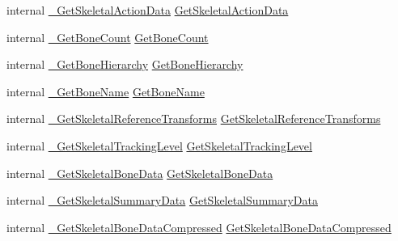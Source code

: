 \begin{DoxyCompactItemize}
\item 
internal \mbox{\hyperlink{struct_valve_1_1_v_r_1_1_i_v_r_input_ab2dfec875e32f9da69b95675a94957a7}{\+\_\+\+Get\+Skeletal\+Action\+Data}} \mbox{\hyperlink{struct_valve_1_1_v_r_1_1_i_v_r_input_aca7416db314f3341f5ad411a04a431df}{Get\+Skeletal\+Action\+Data}}
\item 
internal \mbox{\hyperlink{struct_valve_1_1_v_r_1_1_i_v_r_input_a45156426324aa529ba4317faa0ddbded}{\+\_\+\+Get\+Bone\+Count}} \mbox{\hyperlink{struct_valve_1_1_v_r_1_1_i_v_r_input_a0b5ff4370a510db94339ade7e82cb2c8}{Get\+Bone\+Count}}
\item 
internal \mbox{\hyperlink{struct_valve_1_1_v_r_1_1_i_v_r_input_a1e1830a194a220b6947473ecfb0966db}{\+\_\+\+Get\+Bone\+Hierarchy}} \mbox{\hyperlink{struct_valve_1_1_v_r_1_1_i_v_r_input_a11001075e37728a43dbf3af84bdb8140}{Get\+Bone\+Hierarchy}}
\item 
internal \mbox{\hyperlink{struct_valve_1_1_v_r_1_1_i_v_r_input_ab946688fdae1876df1fa3c06426579cf}{\+\_\+\+Get\+Bone\+Name}} \mbox{\hyperlink{struct_valve_1_1_v_r_1_1_i_v_r_input_a34221d6f94345f4c7f2621a55978a202}{Get\+Bone\+Name}}
\item 
internal \mbox{\hyperlink{struct_valve_1_1_v_r_1_1_i_v_r_input_a1d1f340254e37a3037714eb5ee548afd}{\+\_\+\+Get\+Skeletal\+Reference\+Transforms}} \mbox{\hyperlink{struct_valve_1_1_v_r_1_1_i_v_r_input_a617bf2834dfe52f9f0d0bed5c4bdcae1}{Get\+Skeletal\+Reference\+Transforms}}
\item 
internal \mbox{\hyperlink{struct_valve_1_1_v_r_1_1_i_v_r_input_a0521ebd1a374c8e54ca2864d7b6d57eb}{\+\_\+\+Get\+Skeletal\+Tracking\+Level}} \mbox{\hyperlink{struct_valve_1_1_v_r_1_1_i_v_r_input_ae77211631324af5588fcbd18f87b65f3}{Get\+Skeletal\+Tracking\+Level}}
\item 
internal \mbox{\hyperlink{struct_valve_1_1_v_r_1_1_i_v_r_input_a51bb3d46fb9a17ce1918475f0e1f0f3f}{\+\_\+\+Get\+Skeletal\+Bone\+Data}} \mbox{\hyperlink{struct_valve_1_1_v_r_1_1_i_v_r_input_a8dcd583eddbee8508f65e9a10df4b297}{Get\+Skeletal\+Bone\+Data}}
\item 
internal \mbox{\hyperlink{struct_valve_1_1_v_r_1_1_i_v_r_input_ae852c5f41c5b1d36119e74ee6dbad779}{\+\_\+\+Get\+Skeletal\+Summary\+Data}} \mbox{\hyperlink{struct_valve_1_1_v_r_1_1_i_v_r_input_a1b266d7be02b592b13fd2886de0cff7f}{Get\+Skeletal\+Summary\+Data}}
\item 
internal \mbox{\hyperlink{struct_valve_1_1_v_r_1_1_i_v_r_input_ac9cf8a486d0d66c088c2eb33b722111d}{\+\_\+\+Get\+Skeletal\+Bone\+Data\+Compressed}} \mbox{\hyperlink{struct_valve_1_1_v_r_1_1_i_v_r_input_aa014a0c1fcf2dfc354a96183bb6e711b}{Get\+Skeletal\+Bone\+Data\+Compressed}}

\end{DoxyCompactItemize}
